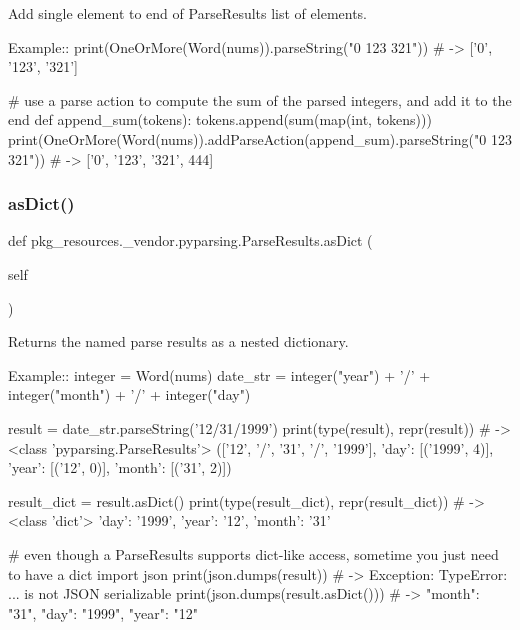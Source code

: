 \begin{DoxyVerb}Add single element to end of ParseResults list of elements.

Example::
    print(OneOrMore(Word(nums)).parseString("0 123 321")) # -> ['0', '123', '321']
    
    # use a parse action to compute the sum of the parsed integers, and add it to the end
    def append_sum(tokens):
tokens.append(sum(map(int, tokens)))
    print(OneOrMore(Word(nums)).addParseAction(append_sum).parseString("0 123 321")) # -> ['0', '123', '321', 444]
\end{DoxyVerb}
 \mbox{\label{classpkg__resources_1_1__vendor_1_1pyparsing_1_1_parse_results_ab73f26af9e7cc95de6dbb0d54d7a81ba}} 
\subsubsection{\texorpdfstring{as\+Dict()}{asDict()}}
{\footnotesize\ttfamily def pkg\+\_\+resources.\+\_\+vendor.\+pyparsing.\+Parse\+Results.\+as\+Dict (\begin{DoxyParamCaption}\item[{}]{self }\end{DoxyParamCaption})}

\begin{DoxyVerb}Returns the named parse results as a nested dictionary.

Example::
    integer = Word(nums)
    date_str = integer("year") + '/' + integer("month") + '/' + integer("day")
    
    result = date_str.parseString('12/31/1999')
    print(type(result), repr(result)) # -> <class 'pyparsing.ParseResults'> (['12', '/', '31', '/', '1999'], {'day': [('1999', 4)], 'year': [('12', 0)], 'month': [('31', 2)]})
    
    result_dict = result.asDict()
    print(type(result_dict), repr(result_dict)) # -> <class 'dict'> {'day': '1999', 'year': '12', 'month': '31'}

    # even though a ParseResults supports dict-like access, sometime you just need to have a dict
    import json
    print(json.dumps(result)) # -> Exception: TypeError: ... is not JSON serializable
    print(json.dumps(result.asDict())) # -> {"month": "31", "day": "1999", "year": "12"}
\end{DoxyVerb}
 \mbox{\label{classpkg__resources_1_1__vendor_1_1pyparsing_1_1_parse_results_aa7e886aa0826871511b189660343f3aa}} 
